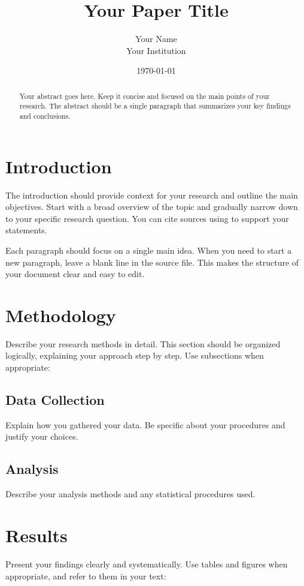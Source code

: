 \documentclass[12pt, titlepage]{article}
\title{\vspace{-1.5in}Your Paper Title}
\author{Your Name\\Your Institution}
\date{\today}
\begin{document}
\maketitle
\thispagestyle{empty}  %

\begin{abstract}
  Your abstract goes here. Keep it concise and focused on the main points of your 
  research. The abstract should be a single paragraph that summarizes your key 
  findings and conclusions.
\end{abstract}

\section{Introduction}
  The introduction should provide context for your research and outline the main 
  objectives. Start with a broad overview of the topic and gradually narrow down 
  to your specific research question. You can cite sources using 
  \cite{example2024} to support your statements.

  Each paragraph should focus on a single main idea. When you need to start a new 
  paragraph, leave a blank line in the source file. This makes the structure of 
  your document clear and easy to edit.

\section{Methodology}
  Describe your research methods in detail. This section should be organized 
  logically, explaining your approach step by step. Use subsections when 
  appropriate:

  \subsection{Data Collection}
    Explain how you gathered your data. Be specific about your procedures and 
    justify your choices.

  \subsection{Analysis}
    Describe your analysis methods and any statistical procedures used.

\section{Results}
  Present your findings clearly and systematically. Use tables and figures when 
  appropriate, and refer to them in your text:
\end{document}
